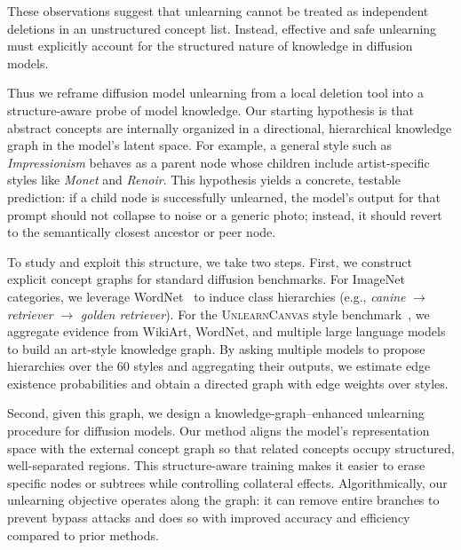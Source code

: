 These observations suggest that unlearning cannot be treated as independent deletions in an unstructured concept list. Instead, effective and safe unlearning must explicitly account for the structured nature of knowledge in diffusion models.

Thus we reframe diffusion model unlearning from a local deletion tool into a structure-aware probe of model knowledge. Our starting hypothesis is that abstract concepts are internally organized in a directional, hierarchical knowledge graph in the model’s latent space. For example, a general style such as \emph{Impressionism} behaves as a parent node whose children include artist-specific styles like \emph{Monet} and \emph{Renoir}. This hypothesis yields a concrete, testable prediction: if a child node is successfully unlearned, the model’s output for that prompt should not collapse to noise or a generic photo; instead, it should revert to the semantically closest ancestor or peer node.

To study and exploit this structure, we take two steps. First, we construct explicit concept graphs for standard diffusion benchmarks. For ImageNet~\cite{deng2009imagenet} categories, we leverage WordNet~\cite{fellbaum1998wordnet} to induce class hierarchies (e.g., \textit{canine} $\rightarrow$ \textit{retriever} $\rightarrow$ \textit{golden retriever}). For the \textsc{UnlearnCanvas} style benchmark~\cite{zhang2024unlearncanvas}, we aggregate evidence from WikiArt, WordNet, and multiple large language models to build an art-style knowledge graph. By asking multiple models to propose hierarchies over the 60 styles and aggregating their outputs, we estimate edge existence probabilities and obtain a directed graph with edge weights over styles.

Second, given this graph, we design a knowledge-graph–enhanced unlearning procedure for diffusion models. Our method aligns the model’s representation space with the external concept graph so that related concepts occupy structured, well-separated regions. This structure-aware training makes it easier to erase specific nodes or subtrees while controlling collateral effects. Algorithmically, our unlearning objective operates along the graph: it can remove entire branches to prevent bypass attacks and does so with improved accuracy and efficiency compared to prior methods.

